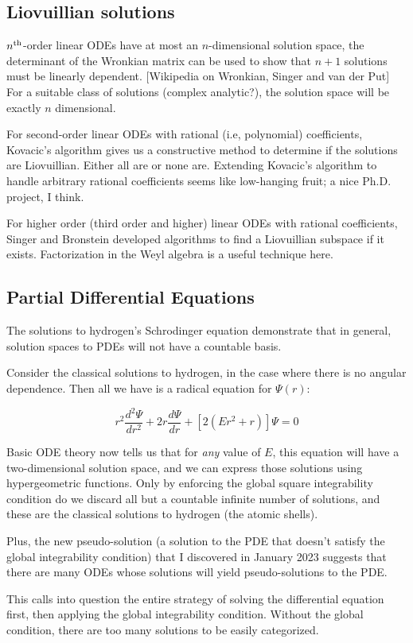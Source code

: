 \documentclass{article}
\begin{document}
\subsection*{Liovuillian solutions}

$n^{\rm th}$-order linear ODEs have at most an $n$-dimensional solution space,
the determinant of the Wronkian matrix can be used to show that $n+1$ solutions
must be linearly dependent.  [Wikipedia on Wronkian, Singer and van der Put]
For a suitable class of solutions (complex analytic?), the solution space
will be exactly $n$ dimensional.

For second-order linear ODEs with rational (i.e, polynomial) coefficients,
Kovacic's algorithm gives us a constructive method to determine if
the solutions are Liovuillian.  Either all are or none are.
Extending Kovacic's algorithm to handle arbitrary rational coefficients
seems like low-hanging fruit; a nice Ph.D. project, I think.

For higher order (third order and higher) linear ODEs with rational coefficients, Singer and Bronstein
developed algorithms to find a Liovuillian subspace if it exists.
Factorization in the Weyl algebra is a useful technique here.

\subsection*{Partial Differential Equations}

The solutions to hydrogen's Schrodinger equation demonstrate that in general,
solution spaces to PDEs will not have a countable basis.

Consider the classical solutions to hydrogen, in the case where there
is no angular dependence.  Then all we have is a radical equation for $\Psi(r)$:

\[ r^2 \frac{d^2\Psi}{dr^2} + 2r \frac{d\Psi}{dr} + \left[2(E r^2+r)\right] \Psi = 0 \]

Basic ODE theory now tells us that for {\it any} value of $E$, this equation
will have a two-dimensional solution space, and we can express those solutions
using hypergeometric functions.  Only by enforcing the global square integrability
condition do we discard all but a countable infinite number of solutions, and
these are the classical solutions to hydrogen (the atomic shells).

Plus, the new pseudo-solution (a solution to the PDE that doesn't satisfy the global integrability condition)
that I discovered in January 2023 suggests that
there are many ODEs whose solutions will yield pseudo-solutions to the PDE.

This calls into
question the entire strategy of solving the differential equation first,
then applying the global integrability condition.  Without the global
condition, there are too many solutions to be easily categorized.
\end{document}
